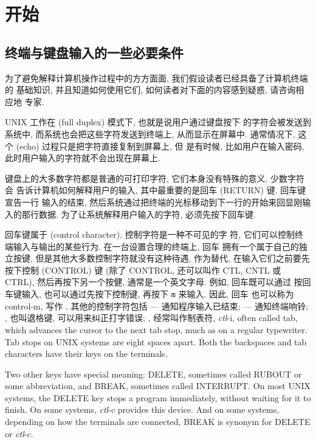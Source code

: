 \section{开始}
\label{sec:getting_started}

\subsection{终端与键盘输入的一些必要条件}
\label{subsec:some_prerequisites_about_terminals_and_typing}

为了避免解释计算机操作过程中的方方面面, 我们假设读者已经具备了计算机终端的
基础知识, 并且知道如何使用它们, 如何读者对下面的内容感到疑惑, 请咨询相应地
专家.

UNIX 工作在  (full duplex) 模式下, 也就是说用户通过键盘按下
的字符会被发送到系统中, 而系统也会把这些字符发送到终端上, 从而显示在屏幕中.
通常情况下, 这个  (echo) 过程只是把字符直接复制到屏幕上, 但
是有时候, 比如用户在输入密码, 此时用户输入的字符就不会出现在屏幕上.

键盘上的大多数字符都是普通的可打印字符, 它们本身没有特殊的意义. 少数字符会
告诉计算机如何解释用户的输入, 其中最重要的是回车 (RETURN) 键. 回车键宣告一行
输入的结束, 然后系统通过把终端的光标移动到下一行的开始来回显刚输入的那行数据.
为了让系统解释用户输入的字符, 必须先按下回车键.

回车键属于  (control character). 控制字符是一种不可见的字
符, 它们可以控制终端输入与输出的某些行为. 在一台设置合理的终端上, 回车
拥有一个属于自己的独立按键, 但是其他大多数控制字符就没有这种待遇, 作为替代,
在输入它们之前要先按下控制 (CONTROL) 键 (除了 CONTROL, 还可以叫作 CTL,
CNTL 或 CTRL), 然后再按下另一个按健, 通常是一个英文字母. 例如, 回车既可以通过
按回车键输入, 也可以通过先按下控制键, 再按下 \texttt{m} 来输入. 因此, 回车
也可以称为 control-m, 写作 . 其他的控制字符包括  ---
通知程序输入已结束;  --- 通知终端响铃; , 也叫退格键,
可以用来纠正打字错误; , 经常叫作制表符,
\textit{ctl}-i, often called tab, which advances the cursor to the next tab
stop, much as on a regular typewriter. Tab stops on UNIX systems are eight
spaces apart. Both the backspaces and tab characters have their keys on the
terminals.

Two other keys have special meaning: DELETE, sometimes called RUBOUT or some
abbreviation, and BREAK, sometimes called INTERRUPT. On most UNIX systems, the
DELETE key stops a program immediately, without waiting for it to finish. On
some systems, \textit{ctl}-c provides this device. And on some systems,
depending on how the terminals are connected, BREAK is synonym for DELETE or
\textit{ctl}-c.


